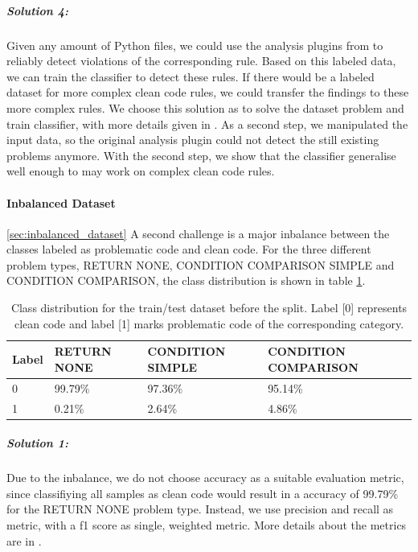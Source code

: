 \subparagraph{Solution 4:}
Given any amount of Python files, we could use the analysis plugins from  to reliably detect violations of the corresponding rule. Based on this labeled data, we can train the classifier to detect these rules. If there would be a labeled dataset for more complex clean code rules, we could transfer the findings to these more complex rules. We choose this solution as to solve the dataset problem and train classifier, with more details given in . As a second step, we manipulated the input data, so the original analysis plugin could not detect the still existing problems anymore. With the second step, we show that the classifier generalise well enough to may work on complex clean code rules.

\paragraph{Inbalanced Dataset}\ref{sec:inbalanced_dataset}
A second challenge is a major inbalance between the classes labeled as problematic code and clean code. For the three different problem types, RETURN NONE, CONDITION COMPARISON SIMPLE and CONDITION COMPARISON, the class distribution is shown in table \ref{tab:class_distribution_in_dataset}.



\begin{table}[]
    \begin{tabular}{@{}llll@{}}
    \toprule
    Label  & RETURN NONE & CONDITION SIMPLE & CONDITION COMPARISON \\ \midrule
    0 & 99.79\%     & 97.36\%          & 95.14\%              \\
    1 & 0.21\%      & 2.64\%           & 4.86\%               \\ \bottomrule
    \end{tabular}
    \caption{Class distribution for the train/test dataset before the split. Label [0] represents clean code and label [1] marks problematic code of the corresponding category.}
    \label{tab:class_distribution_in_dataset}
    \end{table}


\subparagraph{Solution 1:}
Due to the inbalance, we do not choose accuracy as a suitable evaluation metric, since classifiying all samples as clean code would result in a accuracy of 99.79\% for the RETURN NONE problem type. Instead, we use precision and recall as metric, with a f1 score as single, weighted metric. More details about the metrics are in .

